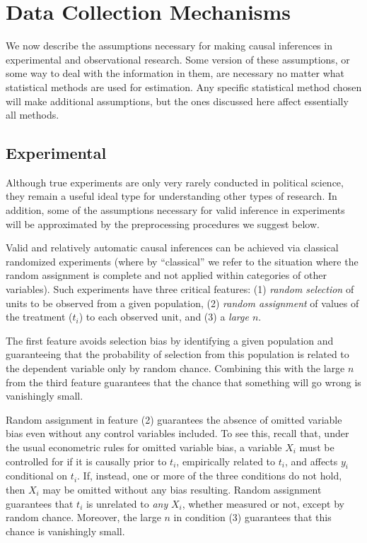 \documentclass[11pt,titlepage]{article}
\begin{document}
\section{Data Collection Mechanisms}

We now describe the assumptions necessary for making causal inferences
in experimental and observational research.  Some version of these
assumptions, or some way to deal with the information in them, are
necessary no matter what statistical methods are used for estimation.
Any specific statistical method chosen will make additional
assumptions, but the ones discussed here affect essentially all
methods.

\subsection{Experimental}

Although true experiments are only very rarely conducted in political
science, they remain a useful ideal type for understanding other types
of research.  In addition, some of the assumptions necessary for valid
inference in experiments will be approximated by the preprocessing
procedures we suggest below.

Valid and relatively automatic causal inferences can be achieved via
classical randomized experiments (where by ``classical'' we refer to
the situation where the random assignment is complete and not applied
within categories of other variables).  Such experiments have three
critical features: (1) \emph{random selection} of units to be observed from a given
population, (2) \emph{random assignment} of values of
the treatment ($t_i$) to each observed unit, and (3) a \emph{large
  $n$}.

The first feature avoids selection bias by identifying a given
population and guaranteeing that the probability of selection from
this population is related to the dependent variable only by random
chance.  Combining this with the large $n$ from the third feature
guarantees that the chance that something will go wrong is vanishingly
small.

Random assignment in feature (2) guarantees the absence of omitted
variable bias even without any control variables included.  To see
this, recall that, under the usual econometric rules for omitted
variable bias, a variable $X_i$ must be controlled for if it is
causally prior to $t_i$, empirically related to $t_i$, and affects
$y_i$ conditional on $t_i$.  If, instead, one or more of the three
conditions do not hold, then $X_i$ may be omitted without any bias
resulting.  Random assignment guarantees that $t_i$ is unrelated to
\emph{any} $X_i$, whether measured or not, except by random chance.
Moreover, the large $n$ in condition (3) guarantees that this chance
is vanishingly small.
\end{document}
